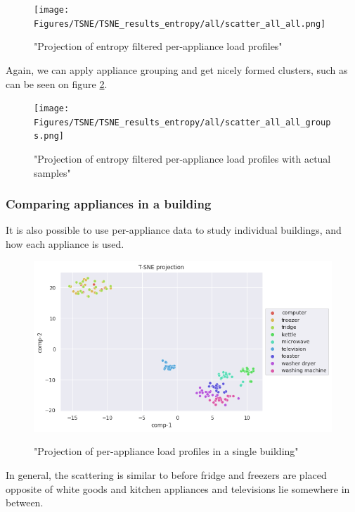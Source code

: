 \begin{figure}[H]
	\centering
	\caption{"Projection of entropy filtered per-appliance load profiles"}
	\texttt{[image: Figures/TSNE/TSNE\_results\_entropy/all/scatter\_all\_all.png]}
	\label{fig:tsne_papb_scatter_ent_all_groups}
\end{figure}

Again, we can apply appliance grouping and get nicely formed clusters, such as can be seen on figure \ref{fig:tsne_papb_img_scatter_ent_all_groups}.


\begin{figure}[H]
	\centering
	\caption{"Projection of entropy filtered per-appliance load profiles with actual samples"}
	\texttt{[image: Figures/TSNE/TSNE\_results\_entropy/all/scatter\_all\_all\_groups.png]}
	\label{fig:tsne_papb_img_scatter_ent_all_groups}
\end{figure}


\subsubsection{Comparing appliances in a building}

It is also possible to use per-appliance data to study
individual buildings, and how each appliance is used.

\begin{figure}[H]
	\centering
	\caption{"Projection of per-appliance load profiles in a single building"}
	\includegraphics[width=.8\textwidth]{Figures/TSNE/TSNE_results/refit/scatter_refit_8.png}
	\label{fig:tsne_papb_scatter_ent_refit8}
\end{figure}

In general, the scattering is similar to before
fridge and freezers are placed opposite of white goods and kitchen appliances and 
televisions lie somewhere in between. 

